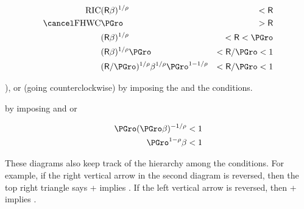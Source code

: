 \begin{eqnarray}
  \text{\RIC} & (\Rfree \DiscFac)^{1/\CRRA} & < \Rfree \\
  \text{\cncl{FHWC}} & \PGro & > \Rfree \\
  & (\Rfree \DiscFac)^{1/\CRRA} & < \Rfree < \PGro \\
  & (\Rfree \DiscFac)^{1/\CRRA}\PGro & < \Rfree/\PGro < 1 \\
  & (\Rfree/\PGro)^{1/\CRRA} \DiscFac^{1/\CRRA}\PGro^{1-1/\CRRA} & < \Rfree/\PGro < 1 \\
\end{eqnarray}

), or (going counterclockwise) by imposing the {\RIC} and the  conditions.

by imposing {\RIC} and {} or 


\begin{equation}\begin{gathered}\begin{aligned}
  \PGro (\PGro \DiscFac)^{-1/\CRRA} & < 1 \\
  \PGro^{1-\CRRA} \DiscFac & < 1 \\
\end{aligned}\end{gathered}\end{equation}

These diagrams also keep track of the hierarchy among the conditions. For example, if the right vertical arrow in the second diagram is reversed, then the top right triangle says \PFFVAC + \cncl{\FHWC} implies \PFGIC. If the left vertical arrow is reversed, then \cncl{\RIC} + {\PFGIC} implies \cncl{\FHWC}. 

